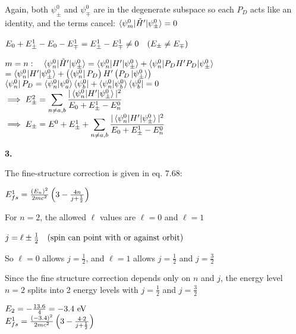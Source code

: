 \documentclass[14pt]{extarticle}
\makeatletter
\newenvironment{lefteqs}{%
    \begin{flushleft}%
    \renewcommand{\arraystretch}{1.3}%
    $\begin{array}{@{}l@{}}%
}{%
    \end{array}$%
    \end{flushleft}%
}
\makeatother
\begin{document}
Again, both $\psi^0_{\pm}$ and $\psi^0_{\mp}$ are in the degenerate subspace so each $P_D$ acts like an identity, and the terms cancel: $\braket{\psi^0_m | \tilde{H}' | \psi^0_{\pm}} = 0$

\begin{lefteqs}
    E_0 + E^1_{\pm} - E_0 - E^1_{\mp} = E^1_{\pm} - E^1_{\mp} \neq 0 \quad (E_{\pm} \neq E_{\mp})
\end{lefteqs}

\begin{lefteqs}
    m = n : \quad \braket{\psi^0_n | \tilde{H}' | \psi^0_{\pm}} = \braket{\psi^0_n | H' | \psi^0_{\pm}} + \braket{\psi^0_n | P_D H' P_D | \psi^0_{\pm}} \\
    = \braket{\psi^0_n | H' | \psi^0_{\pm}} + \left( \bra{\psi^0_n} P_D \right) H' \left( P_D \ket{\psi^0_{\pm}} \right) \\
    \bra{\psi^0_n} P_D = \braket{\psi^0_n | \psi^0_a} \bra{\psi^0_b} + \braket{\psi^0_n | \psi^0_b} \bra{\psi^0_b} = 0 \\
    \implies E^2_{\pm} = \displaystyle \sum_{n \neq a,b} \frac{|\braket{\psi^0_n | H' | \psi^0_{\pm}}|^2}{E_0 + E^1_{\pm} - E^0_n} \\
    \implies E_{\pm} = E^0 + E^1_{\pm} + \displaystyle \sum_{n \neq a,b} \frac{|\braket{\psi^0_n | H' | \psi^0_{\pm}}|^2}{E_0 + E^1_{\pm} - E^0_n}
\end{lefteqs}

\newpage

\textbf{\large 3.}

The fine-structure correction is given in eq. 7.68:

\begin{lefteqs}
    E^1_{fs} = \frac{(E_n)^2}{2mc^2} \left( 3 - \frac{4n}{j + \frac{1}{2}} \right)
\end{lefteqs}

For $n=2$, the allowed $\ell$ values are $\ell=0$ and $\ell=1$

\begin{lefteqs}
    j = \ell \pm \frac{1}{2} \quad \text{(spin can point with or against orbit)}
\end{lefteqs}

So $\ell=0$ allows $j=\frac{1}{2}$, and $\ell=1$ allows $j=\frac{1}{2}$ and $j=\frac{3}{2}$

Since the fine structure correction depends only on $n$ and $j$, the energy level $n=2$ splits into 2 energy levels with $j=\frac{1}{2}$ and $j=\frac{3}{2}$

\begin{lefteqs}
    E_2 = -\frac{13.6}{4} = -3.4 \text{ eV} \\
    E^1_{fs} = \frac{(-3.4)^2}{2mc^2} \left( 3 - \frac{4 \cdot 2}{j + \frac{1}{2}} \right)
\end{lefteqs}
\end{document}
